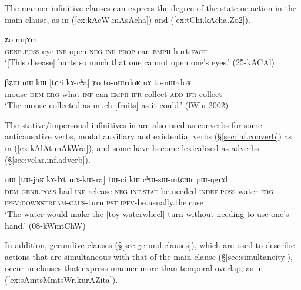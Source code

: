 The manner infinitive clauses can express the degree of the state or action in the main clause, as in (\ref{ex:kAcW.mAsAcha}) and (\ref{ex:tChi.kAcha.Zo2}). 

\begin{exe}
\ex \label{ex:kAcW.mAsAcha}
 ʑo mŋɤm  \\
\textsc{genr}.\textsc{poss}-eye \textsc{inf}-open \textsc{neg}-\textsc{inf}-\textsc{prop}-can \textsc{emph} hurt:\textsc{fact} \\
\glt `[This disease] hurts so much that one cannot open one's eyes.' (25-kACAl)
\end{exe}

\begin{exe}
\ex \label{ex:tChi.kAcha.Zo2}
\gll βʑɯ nɯ kɯ [tɕʰi kɤ-cʰa] ʑo to-nɯrdoʁ nɤ to-nɯrdoʁ \\
mouse \textsc{dem} \textsc{erg} what \textsc{inf}-can \textsc{emph} \textsc{ifr}-collect \textsc{add} \textsc{ifr}-collect \\
\glt `The mouse collected as much [fruits] as it could.' (lWlu 2002)
\end{exe}


The stative/impersonal infinitives in  are also used as converbs for some anticausative verbs, modal auxiliary and existential verbs (§\ref{sec:inf.converb}) as in (\ref{ex:kAlAt.mAkWra}), and some have become lexicalized as adverbs (§\ref{sec:velar.inf.adverb}).

\begin{exe}
\ex \label{ex:kAlAt.mAkWra}
\gll nɯ [tɯ-jaʁ kɤ-lɤt mɤ-kɯ-ra] tɯ-ci kɯ cʰɯ-sɯ-mtɕɯr pɯ-ŋgrɤl \\
\textsc{dem} \textsc{genr}.\textsc{poss}-had \textsc{inf}-release \textsc{neg}-\textsc{inf}:\textsc{stat}-be.needed \textsc{indef}.\textsc{poss}-water \textsc{erg} \textsc{ipfv}:\textsc{downstream}-\textsc{caus}-turn \textsc{pst}.\textsc{ipfv}-be.usually.the.case \\
\glt `The water would make the [toy waterwheel] turn without needing to use one's hand.' (08-kWmtChW)
\end{exe}

In addition, gerundive clauses (§\ref{sec:gerund.clauses}), which are used to describe actions that are simultaneous with that of the main clause (§\ref{sec:simultaneity}), occur in clauses that express manner more than temporal overlap, as in (\ref{ex:sAmtsMmtsWr.kurAZita}).

